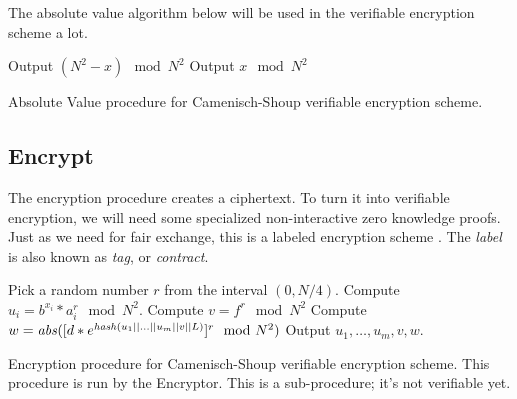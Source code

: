 The absolute value algorithm below will be used in the verifiable encryption scheme a lot.


\begin{algorithm}[H]\label{absVE}
\dontprintsemicolon

\BlankLine

 \;
\Indp
    {Output $(N^2 - x) \mod N^2$ \;}
  \Else
    {Output $x \mod N^2$ \;}
\Indm

\caption{Absolute Value procedure for Camenisch-Shoup verifiable encryption scheme.}
\end{algorithm}





\subsection{Encrypt}
The encryption procedure creates a ciphertext. To turn it into verifiable encryption, we will need some specialized non-interactive zero knowledge proofs. Just as we need for fair exchange, this is a labeled encryption scheme \cite{LABELED-ENC}. The \textit{label} is also known as \textit{tag}, or \textit{contract}.



\begin{algorithm}[H]\label{encryptVE}
\dontprintsemicolon

\BlankLine

 \;
\Indp
  Pick a random number $r$ from the interval $(0,N / 4)$. \;
    {Compute $u_i = b^{x_i} * a_{i}^{r} \mod N^2$. \;}
  Compute $v = f^r \mod N^2$ \;
  Compute $w = \mathit{abs}([d * e^{\mathit{hash}(u_1 \mid\mid \ldots \mid\mid u_m \mid\mid v \mid\mid L)}]^r \mod N^2)$ \;
  Output $u_1,\ldots,u_m,v,w$. \;
\Indm

\caption{Encryption procedure for Camenisch-Shoup verifiable encryption scheme. This procedure is run by the Encryptor. This is a sub-procedure; it's not verifiable yet.}
\end{algorithm}




